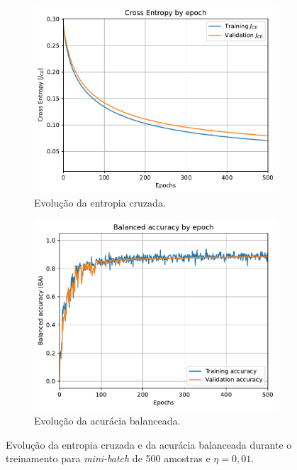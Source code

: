 \begin{figure}[H]
	\begin{subfigure}[H]{0.49\textwidth}
		\centering
		\includegraphics[width = 0.98\linewidth]{../../plot/LR_1/CE_500_epochs_batch_size500}
		\caption{Evolução da entropia cruzada.}
		\label{fig:CE_500_epochs_batch_size500}
	\end{subfigure}
	\begin{subfigure}[H]{0.49\textwidth}
		\centering
		\includegraphics[width = 0.99\linewidth]{../../plot/LR_1/BA_500_epochs_batch_size500}
		\caption{Evolução da acurácia balanceada.}
		\label{fig:BA_500_epochs_batch_size500}
	\end{subfigure}
	\caption{Evolução da entropia cruzada e da acurácia balanceada durante o treinamento para \textit{mini-batch} de 500 amostras e $\eta = 0,01$.}
\end{figure}

